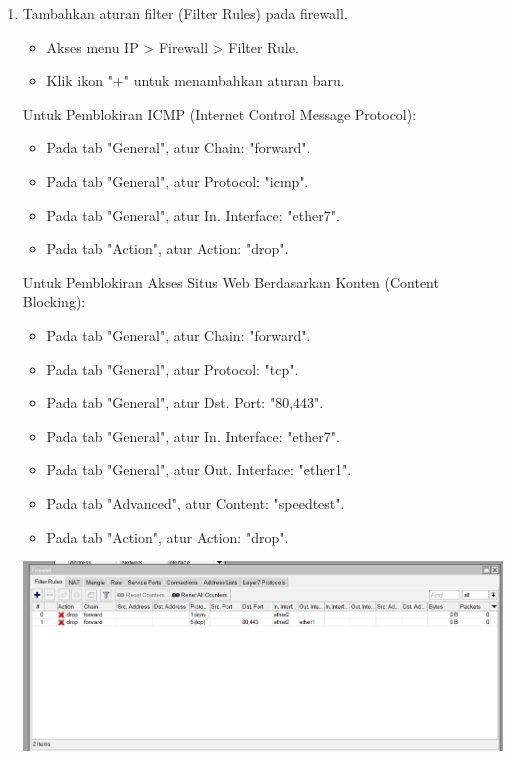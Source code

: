 \begin{enumerate}
    \item Tambahkan aturan filter (Filter Rules) pada firewall.
    \begin{itemize}
        \item Akses menu IP > Firewall > Filter Rule.
        \item Klik ikon "+" untuk menambahkan aturan baru.
    \end{itemize}

    Untuk Pemblokiran ICMP (Internet Control Message Protocol):
    \begin{itemize}
        \item Pada tab "General", atur Chain: "forward".
        \item Pada tab "General", atur Protocol: "icmp".
        \item Pada tab "General", atur In. Interface: "ether7".
        \item Pada tab "Action", atur Action: "drop".
    \end{itemize}

    Untuk Pemblokiran Akses Situs Web Berdasarkan Konten (Content Blocking):
    \begin{itemize}
        \item Pada tab "General", atur Chain: "forward".
        \item Pada tab "General", atur Protocol: "tcp".
        \item Pada tab "General", atur Dst. Port: "80,443".
        \item Pada tab "General", atur In. Interface: "ether7".
        \item Pada tab "General", atur Out. Interface: "ether1".
        \item Pada tab "Advanced", atur Content: "speedtest".
        \item Pada tab "Action", atur Action: "drop".
    \end{itemize}

    \begin{center}
        \includegraphics[scale=0.5]{P1/img/20.png}
    \end{center}


\end{enumerate}
